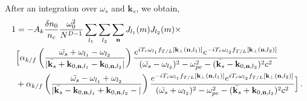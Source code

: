 \documentclass[
 reprint,
 amsmath,amssymb,
 aps,
]{revtex4-1}
\begin{document}
\begin{widetext}
After an integration over $\omega_s$ and $\mathbf{k}_s$, we obtain,
\begin{align}
   1& = -A_k \frac{\delta n_0}{n_c}\frac{\omega_0^2}{N^{D-1}
   } 
    \sum_{l_1}  \sum_{l_2} \sum_{\mathbf{n}}    J_{l_1}(m)J_{l_2}(m)\times \nonumber \\
  & \Big[  
  \alpha_{k/f}\left(\frac{\Bar{\omega_s}+\omega_{l_1}-\omega_{l_2}}
  {\vert\Bar{\mathbf{k}_s}+\mathbf{k}_{0,\mathbf{n},l_1}-\mathbf{k}_{0,\mathbf{n},l_2} \vert}
  \right) 
     \frac{  e^{iT_{r} \omega_{l_1}f_{T/L}[\mathbf{k}_\perp(\mathbf{n},l_1)]  }
  e^{-iT_{r}  \omega_{l_2}f_{T/L}[\mathbf{k}_\perp(\mathbf{n},l_2)]  }
     }{(\Bar{\omega_s}-\omega_{l_2})^2 - \omega_{pe}^2 -(\Bar{\mathbf{k}_s}- \mathbf{k}_{0,\mathbf{n},l_2})^2c^2}
      \nonumber\\&
   +\alpha_{k/f}\left(\frac{\Bar{\omega_s}-\omega_{l_1}+\omega_{l_2}}
   {\vert\Bar{\mathbf{k}_s}-\mathbf{k}_{0,\mathbf{n},l_1}+\mathbf{k}_{0,\mathbf{n},l_2}-\vert} 
   \right)  \frac{   e^{-iT_{r} \omega_{l_1}f_{T/L}[\mathbf{k}_\perp(\mathbf{n},l_1)]  }
  e^{iT_{r}  \omega_{l_2}f_{T/L}[\mathbf{k}_\perp(\mathbf{n},l_2)]  }
   }{(\Bar{\omega_s}+\omega_{l_2})^2 - \omega_{pe}^2 -(\Bar{\mathbf{k}_s}+ \mathbf{k}_{0,\mathbf{n},l_2})^2c^2} 
   \Big]
   \, .\label{eq:fssd4}
\end{align}


\end{widetext}
\end{document}
